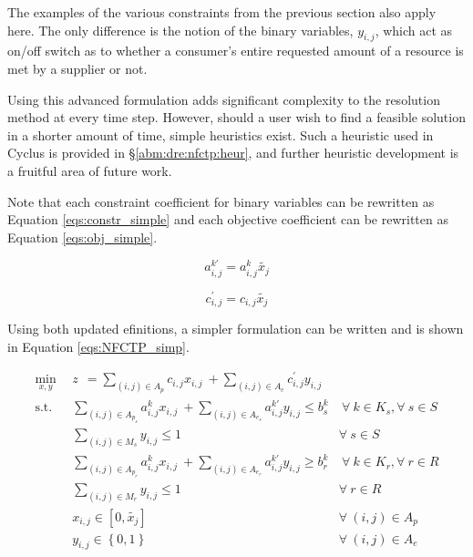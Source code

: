The examples of the various constraints from the previous section also apply
here. The only difference is the notion of the binary variables, $y_{i,j}$,
which act as on/off switch as to whether a consumer's entire requested amount of
a resource is met by a supplier or not. 

Using this advanced formulation adds significant complexity to the resolution
method at every time step. However, should a user wish to find a feasible
solution in a shorter amount of time, simple heuristics exist. Such a heuristic
used in Cyclus is provided in \S \ref{abm:dre:nfctp:heur}, and further heuristic
development is a fruitful area of future work.

Note that each constraint coefficient for binary variables can be rewritten as
Equation \ref{eqs:constr_simple} and each objective coefficient can be rewritten
as Equation \ref{eqs:obj_simple}.

\begin{equation}\label{eqs:constr_simple}
a^{k\prime}_{i,j} = a^k_{i,j} \tilde{x_j}
\end{equation}

\begin{equation}\label{eqs:obj_simple}
c^{\prime}_{i,j} = c_{i,j} \tilde{x_j}
\end{equation}

Using both updated efinitions, a simpler formulation can be written and is shown
in Equation \ref{eqs:NFCTP_simp}.

\begin{subequations}\label{eqs:NFCTP_simp}
  \begin{align}
    \min_{x, y} \:\: 
    & 
    z \:\: = 
    \sum_{(i, j) \in A_p} c_{i,j} x_{i,j} 
    \: + 
    \sum_{(i, j) \in A_e} c^{\prime}_{i,j} y_{i,j} 
    & 
    \label{eqs:NFCTP_simp_obj} \\
    \text{s.t.} \:\: 
    &
    \sum_{(i, j) \in A_{p_s}} a^k_{i,j} x_{i,j}
    \: + 
    \sum_{(i, j) \in A_{e_s}} a^{k\prime}_{i,j} y_{i,j}
    \leq b^k_s 
    &
    \: 
    \forall \: k \in K_s, 
    \forall \: s \in S 
    \label{eqs:NFCTP_simp_sup} \\
    &
    \sum_{(i, j) \in M_{s}} y_{i,j} \leq 1 
    &
    \forall \: s \in S 
    \label{eqs:NFCTP_simp_mut_sup} \\
    &
    \sum_{(i, j) \in A_{p_r}} a^k_{i,j} x_{i,j}
    \: + 
    \sum_{(i, j) \in A_{e_r}} a^{k\prime}_{i,j} y_{i,j}
    \geq b^k_r 
    &
    \: 
    \forall \: k \in K_r,  
    \forall \: r \in R 
    \label{eqs:NFCTP_simp_req} \\
    &
    \sum_{(i, j) \in M_{r}} y_{i,j} \leq 1 
    &
    \forall \: r \in R 
    \label{eqs:NFCTP_simp_mut_req} \\
    &
    x_{i,j} \in [0, \tilde{x_j}]
    &
    \forall \: (i, j) \in A_p
    \label{eqs:NFCTP_simp_x} \\
    &
    y_{i,j} \in \left\{ 0, 1 \right\}
    &
    \forall \: (i, j) \in A_e
    \label{eqs:NFCTP_simp_y}
  \end{align}
\end{subequations}


